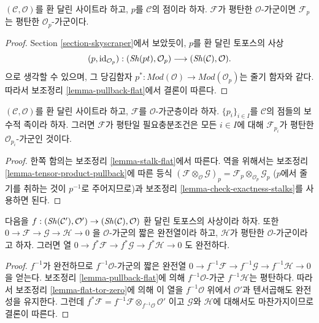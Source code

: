 \begin{lemma}
\label{lemma-stalk-flat}
$(\mathcal{C}, \mathcal{O})$를 환 달린 사이트라 하고,
$p$를 $\mathcal{C}$의 점이라 하자.
$\mathcal{F}$가 평탄한 $\mathcal{O}$-가군이면
$\mathcal{F}_p$는 평탄한 $\mathcal{O}_p$-가군이다.
\end{lemma}

\begin{proof}
Section \ref{section-skyscraper}에서 보았듯이,
$p$를 환 달린 토포스의 사상
$$
(p, \text{id}_{\mathcal{O}_p}) :
(\mathop{\mathit{Sh}}\nolimits(pt), \mathcal{O}_p)
\longrightarrow
(\mathop{\mathit{Sh}}\nolimits(\mathcal{C}), \mathcal{O}).
$$
으로 생각할 수 있으며, 그 당김함자
$p^* : \textit{Mod}(\mathcal{O}) \to \textit{Mod}(\mathcal{O}_p)$는
줄기 함자와 같다. 따라서 보조정리 \ref{lemma-pullback-flat}에서 결론이 따른다.
\end{proof}

\begin{lemma}
\label{lemma-check-flat-stalks}
$(\mathcal{C}, \mathcal{O})$를 환 달린 사이트라 하고,
$\mathcal{F}$를 $\mathcal{O}$-가군층이라 하자.
$\{p_i\}_{i \in I}$를 $\mathcal{C}$의 점들의 보수적 족이라 하자.
그러면 $\mathcal{F}$가 평탄일 필요충분조건은 모든 $i \in I$에 대해
$\mathcal{F}_{p_i}$가 평탄한 $\mathcal{O}_{p_i}$-가군인 것이다.
\end{lemma}

\begin{proof}
한쪽 함의는 보조정리 \ref{lemma-stalk-flat}에서 따른다.
역을 위해서는 보조정리 \ref{lemma-tensor-product-pullback}에 따른 등식
$(\mathcal{F} \otimes_\mathcal{O} \mathcal{G})_p =
\mathcal{F}_p \otimes_{\mathcal{O}_p} \mathcal{G}_p$
($p$에서 줄기를 취하는 것이 $p^{-1}$로 주어지므로)과
보조정리 \ref{lemma-check-exactness-stalks}를 사용하면 된다.
\end{proof}

\begin{lemma}
\label{lemma-pullback-ses}
다음을
$f : (\mathop{\mathit{Sh}}\nolimits(\mathcal{C}'), \mathcal{O}') \to (\mathop{\mathit{Sh}}\nolimits(\mathcal{C}), \mathcal{O})$
환 달린 토포스의 사상이라 하자. 또한
$0 \to \mathcal{F} \to \mathcal{G} \to \mathcal{H} \to 0$
을 $\mathcal{O}$-가군의 짧은 완전열이라 하고,
$\mathcal{H}$가 평탄한 $\mathcal{O}$-가군이라고 하자. 그러면 열
$0 \to f^*\mathcal{F} \to f^*\mathcal{G} \to f^*\mathcal{H} \to 0$
도 완전하다.
\end{lemma}

\begin{proof}
$f^{-1}$가 완전하므로 $f^{-1}\mathcal{O}$-가군의 짧은 완전열
$0 \to f^{-1}\mathcal{F} \to f^{-1}\mathcal{G} \to f^{-1}\mathcal{H} \to 0$
을 얻는다. 보조정리 \ref{lemma-pullback-flat}에 의해
$f^{-1}\mathcal{O}$-가군 $f^{-1}\mathcal{H}$는 평탄하다.
따라서 보조정리 \ref{lemma-flat-tor-zero}에 의해 이 열을
$f^{-1}\mathcal{O}$ 위에서 $\mathcal{O}'$과 텐서곱해도 완전성을 유지한다.
그런데
$f^*\mathcal{F} = f^{-1}\mathcal{F} \otimes_{f^{-1}\mathcal{O}} \mathcal{O}'$
이고 $\mathcal{G}$와 $\mathcal{H}$에 대해서도 마찬가지이므로 결론이 따른다.
\end{proof}





